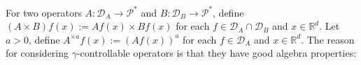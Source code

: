 \documentclass[12pt,oneside,english]{amsart}
\theoremstyle{plain}
\newtheorem{lem}[thm]{Lemma}
\theoremstyle{definition}
\numberwithin{equation}{section}
\newcommand{\added}[1]{{\color{blue}#1}}\newcommand{\deleted}[1]{{\color{red}#1}}
\begin{document}
    \begin{comment}

\deleted{
    The first reason for considering $\gamma$-controllable operators is the following:
\begin{lem}
    Suppose that operators $(A_\lambda)_{\lambda\in \Lambda}$ are uniformly $\gamma$-controllable on $\mathcal D$ for some $\gamma \in \mathbb R$ and $\mathcal D \subset \mathcal P^*$.
    Then \added{for each $\kappa\geq0$,} there exists a $\gamma$-scalable operator $S$ such that
\[
    |A_\lambda T_t^\alpha f|
    \leq e^{\gamma t (\alpha  - \added{\kappa} b)} S\added{Q_{\kappa}}f,
    \quad \lambda \in \Lambda, t\geq 0, f\in \added{ \mathcal{D}\cap\mathcal{P}_{\kappa}}.
\]
\end{lem}

\begin{proof}
    Let $(R,S)$ be the $\gamma$-control-pair for $(A_\lambda)_{\lambda\in \Lambda}$.
    Then
\[
    |A_\lambda T_t^\alpha f| \leq R|T_t^\alpha f|
    \leq R (e^{\alpha t  - \kappa bt}Q_{\kappa}f)
    \leq S (e^{\alpha t  - \kappa bt}Q_{\kappa}f)
    \leq e^{\gamma t (\alpha  - \kappa b)} SQ_{\kappa}f.
    \qedhere
\]
\end{proof}
}
\end{comment}
	For two operators $A: \mathcal D_A \to \mathcal P^*$ and $B: \mathcal D_B \to \mathcal P^*$, define $(A\times B)f (x):= Af(x) \times Bf(x)$ for each $f\in \mathcal D_A \cap \mathcal D_B$ and $x\in \mathbb R^d$.
    Let $a > 0$, define $A^{\times a}f(x):= (Af(x))^a$ for each $f\in \mathcal D_A$ and $x\in \mathbb R^d$.
    The reason for considering $\gamma$-controllable operators is that they have good algebra properties:
\end{document}
